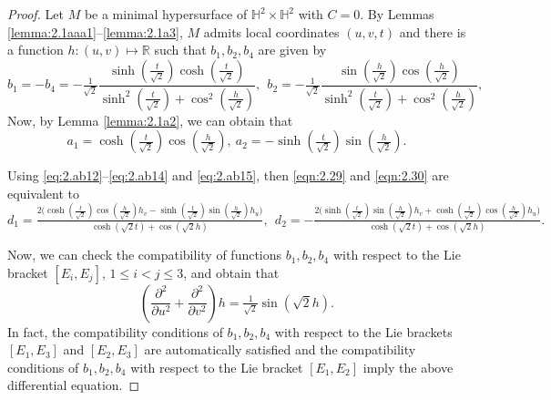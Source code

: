 \documentclass[reqno]{amsart}%
\theoremstyle{definition}
\numberwithin{equation}{section}
\begin{document}
%
\begin{proof}
Let $M$ be a minimal hypersurface of $\mathbb{H}^2\times \mathbb{H}^2$ with $C=0$.
By Lemmas \ref{lemma:2.1aaa1}--\ref{lemma:2.1a3}, $M$ admits local coordinates $(u,v,t)$ and
there is a function $h:(u,v)\mapsto \mathbb{R}$
such that $b_1,b_2,b_4$ are given by
%
\begin{equation}\label{eq:2.ab15}
b_1=-b_4=-\tfrac{1}{\sqrt{2}}\frac{\sinh(\frac{t}{\sqrt{2}})\cosh(\frac{t}{\sqrt{2}})}
{\sinh^2(\frac{t}{\sqrt{2}})+\cos^2(\frac{h}{\sqrt{2}})},\ \
b_2=-\tfrac{1}{\sqrt{2}}\frac{\sin(\frac{h}{\sqrt{2}})\cos(\frac{h}{\sqrt{2}})}
{\sinh^2(\frac{t}{\sqrt{2}})+\cos^2(\frac{h}{\sqrt{2}})},
\end{equation}
Now, by Lemma \ref{lemma:2.1a2}, we can obtain that
%
\begin{equation}\label{eq:2.ab18}
a_1=\cosh(\tfrac{t}{\sqrt{2}})\cos(\tfrac{h}{\sqrt{2}}),\
a_2=-\sinh(\tfrac{t}{\sqrt{2}})\sin(\tfrac{h}{\sqrt{2}}).
\end{equation}

Using \eqref{eq:2.ab12}--\eqref{eq:2.ab14} and \eqref{eq:2.ab15},
then \eqref{eqn:2.29} and \eqref{eqn:2.30} are equivalent to
$$
d_1=\tfrac{2\big(\cosh(\frac{t}{\sqrt{2}})\cos(\frac{h}{\sqrt{2}})h_v
-\sinh(\frac{t}{\sqrt{2}})\sin(\frac{h}{\sqrt{2}})h_u\big)}{\cosh(\sqrt{2}t)+\cos(\sqrt{2}h)},\ \
d_2=-\tfrac{2\big(\sinh(\frac{t}{\sqrt{2}})\sin(\frac{h}{\sqrt{2}})h_v
+\cosh(\frac{t}{\sqrt{2}})\cos(\frac{h}{\sqrt{2}})h_u\big)}{\cosh(\sqrt{2}t)+\cos(\sqrt{2}h)}.
$$

Now, we can check the compatibility of functions $b_1,b_2,b_4$ with respect to the Lie bracket $[E_i,E_j]$,
$1\leq i<j\leq3$, and obtain that
$$
(\frac{\partial^2}{\partial u^2}+\frac{\partial^2}{\partial v^2})h
=\tfrac{1}{\sqrt{2}}\sin(\sqrt{2}h).
$$
In fact, the  compatibility conditions of  $b_1,b_2,b_4$  with respect to the Lie brackets $[E_1,E_3]$ and $[E_2,E_3]$ are automatically satisfied and the compatibility conditions of  $b_1,b_2,b_4$  with respect to the Lie bracket $[E_1,E_2]$  imply the above differential equation.



\end{proof}
\end{document}
